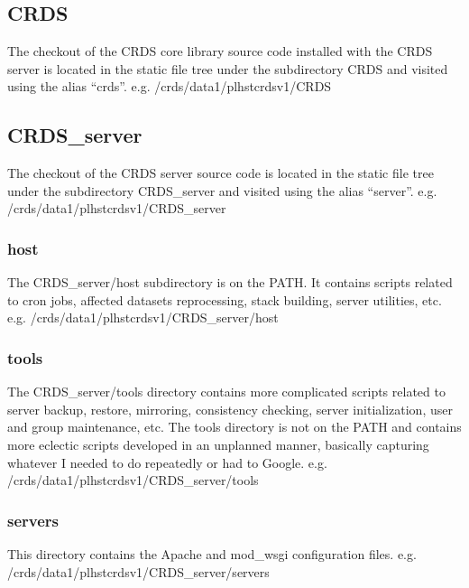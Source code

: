 \documentclass[letterpaper,10pt,english]{sphinxmanual}
\begin{document}
\subsection{CRDS}
\label{server_guide:crds}
The checkout of the CRDS core library source code installed with the CRDS server is located in the static file tree
under the subdirectory CRDS and visited using the alias ``crds''.  e.g.  /crds/data1/plhstcrdsv1/CRDS


\subsection{CRDS\_server}
\label{server_guide:crds-server}
The checkout of the CRDS server source code is located in the static file tree under the subdirectory CRDS\_server
and visited using the alias ``server''.  e.g. /crds/data1/plhstcrdsv1/CRDS\_server


\subsubsection{host}
\label{server_guide:host}
The CRDS\_server/host subdirectory is on the PATH.  It contains scripts related to cron jobs,  affected datasets
reprocessing, stack building,  server utilities, etc.   e.g. /crds/data1/plhstcrdsv1/CRDS\_server/host


\subsubsection{tools}
\label{server_guide:tools}
The CRDS\_server/tools directory contains more complicated scripts related to server backup, restore, mirroring,
consistency checking, server initialization, user and group maintenance, etc.   The tools directory is not on the
PATH and contains more eclectic scripts developed in an unplanned manner,  basically capturing whatever I needed
to do repeatedly or had to Google.   e.g. /crds/data1/plhstcrdsv1/CRDS\_server/tools


\subsubsection{servers}
\label{server_guide:id1}
This directory contains the Apache and mod\_wsgi configuration files.  e.g. /crds/data1/plhstcrdsv1/CRDS\_server/servers
\end{document}

